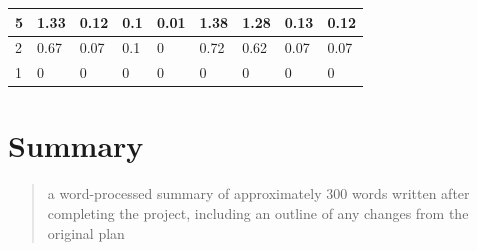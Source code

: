 \documentclass{article}
\begin{document}
\begin{table}[]
\begin{tabular}{|l|l|l|l|l|l|l|l|l|}
5                                                                               & 1.33                  & 0.12                  & 0.1                   & 0.01                  & 1.38                  & 1.28                  & 0.13                  & 0.12                  \\ \hline
2                                                                               & 0.67                  & 0.07                  & 0.1                   & 0                     & 0.72                  & 0.62                  & 0.07                  & 0.07                  \\ \hline
1                                                                               & 0                     & 0                     & 0                     & 0                     & 0                     & 0                     & 0                     & 0                     \\ \hline
\end{tabular}
\end{table}

\section{Summary}
\begin{quote}
  a word-processed summary of approximately 300 words written after completing the project, including an outline of any changes from the original plan
\end{quote}
\end{document}
